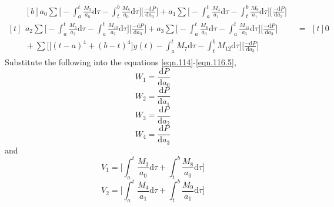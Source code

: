 \documentclass[letterpaper%
, twoside%
, 12pt%
,memoire%
, english%
,creativecommons,hyperref%
]{thETS}
\theoremstyle{newThmStyle}
\begin{document}
\begin{equation}\label{eqn.116.5}
\begin{aligned}[t]
	\begin{aligned}[b]
	a_{0} \sum \bigg[-\int_{a}^{t}\frac{M_{3}}{a_{0}}\mathrm{d}\tau-\int_{t}^{b}\frac{M_{8}}{a_{0}}\mathrm{d}\tau\bigg] \bigg[\frac{-\mathrm{d}P}{\mathrm{d}a_{3}}\bigg] + a_{1} \sum \bigg[-\int_{a}^{t}\frac{M_{4}}{a_{1}}\mathrm{d}\tau-\int_{t}^{b}\frac{M_{9}}{a_{1}}\mathrm{d}\tau\bigg] \bigg[\frac{-\mathrm{d}P}{\mathrm{d}a_{3}}\bigg] \\
	a_{2} \sum \bigg[-\int_{a}^{t}\frac{M_{5}}{a_{2}}\mathrm{d}\tau-\int_{a}^{t}\frac{M_{10}}{a_{2}}\mathrm{d}\tau\bigg] \bigg[\frac{-\mathrm{d}P}{\mathrm{d}a_{3}}\bigg] + a_{3} \sum \bigg[-\int_{a}^{t}\frac{M_{6}}{a_{3}}\mathrm{d}\tau-\int_{a}^{t}\frac{M_{11}}{a_{3}}\mathrm{d}\tau\bigg] \bigg[\frac{-\mathrm{d}P}{\mathrm{d}a_{3}}\bigg] \\ 
	{} +\sum\bigg[\big[(t-a)^4+(b-t)^4\big]y(t) -\int_{a}^{t}{M_{7}}\mathrm{d}\tau-\int_{t}^{b}{M_{12}}\mathrm{d}\tau \bigg]\bigg[\frac{-\mathrm{d}P}{\mathrm{d}a_{3}}\bigg]
	\end{aligned}
	& =
	\begin{aligned}[t]
	0
	\end{aligned}
\end{aligned}
\end{equation}
Substitute the following into the equations \eqref{eqn.114}-\eqref{eqn.116.5},
\begin{equation}\label{eqn.117}
W_{1} = \frac{\mathrm{d}P}{\mathrm{d}a_{0}}
\end{equation}
\begin{equation}\label{eqn.118}
W_{2} = \frac{\mathrm{d}P}{\mathrm{d}a_{1}}
\end{equation}
\begin{equation}\label{eqn.119}
W_{3} = \frac{\mathrm{d}P}{\mathrm{d}a_{2}}
\end{equation}
\begin{equation}\label{eqn.119.5}
W_{4} = \frac{\mathrm{d}P}{\mathrm{d}a_{3}}
\end{equation}
and
\begin{equation}\label{eqn.120}
V_{1} = \bigg[\int_{a}^{t}\frac{M_{3}}{a_{0}} \mathrm{d}\tau + \int_{t}^{b}\frac{M_{8}}{a_{0}} \mathrm{d}\tau \bigg]
\end{equation}
\begin{equation}\label{eqn.121}
V_{2} = \bigg[\int_{a}^{t}\frac{M_{4}}{a_{1}} \mathrm{d}\tau + \int_{t}^{b}\frac{M_{9}}{a_{1}} \mathrm{d}\tau \bigg]
\end{equation}
\end{document}
